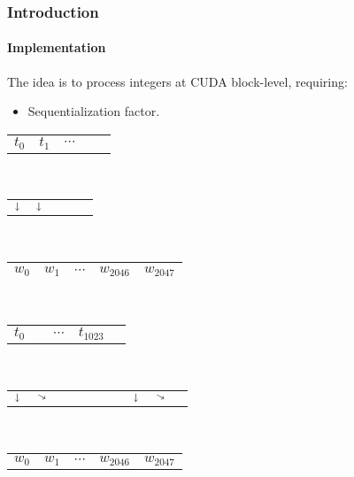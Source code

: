 \begin{frame}
  \frametitle{Introduction}
  \framesubtitle{Implementation}
  The idea is to process integers at CUDA block-level\pause , requiring:
  \begin{itemize}
  \item Sequentialization factor.
  \end{itemize}\vspace*{-0.4em}
  \begin{center}
  {\tiny
  \begin{minipage}{0.45\textwidth}
    \centering
      \begin{tabular}{C{0.6cm}C{0.6cm}C{0.6cm}C{0.6cm}C{0.6cm}}
        $t_0$ & $t_1$ & $\cdots$ & & \\
      \end{tabular}\\[-0.5ex]
      \begin{tabular}{C{0.6cm}C{0.6cm}C{0.6cm}C{0.6cm}C{0.6cm}}
        $\shortdownarrow$ & $\shortdownarrow$ & & & \\
      \end{tabular}\\[-0.5ex]
      \begin{tabular}{|C{0.59cm}|C{0.59cm}|C{0.59cm}|C{0.59cm}|C{0.59cm}|}
        \hline
        $w_0$ & $w_1$ & $\cdots$ & $w_{2046}$ & $w_{2047}$\\
        \hline
      \end{tabular}\\
    \end{minipage}\qquad
    \begin{minipage}{0.45\textwidth}
      \centering
      \begin{tabular}{C{0.6cm}C{0.6cm}C{0.6cm}C{0.6cm}C{0.6cm}}
        $t_0$ & & $\cdots$ & $t_{1023}$ & \\
      \end{tabular}\\[-0.5ex]
      \begin{tabular}{C{0.02cm}C{0.02cm}C{0.02cm}C{0.02cm}C{0.02cm}C{0.02cm}C{0.02cm}C{0.02cm}C{0.02cm}C{0.02cm}}
        $\shortdownarrow$ & $\diagonalarrowdown$ &  &  &  &  &  & $\shortdownarrow$ & $\diagonalarrowdown$ & \\
      \end{tabular}\\[-0.5ex]
      \begin{tabular}{|C{0.59cm}|C{0.59cm}|C{0.59cm}|C{0.59cm}|C{0.59cm}|}
        \hline
        $w_0$ & $w_1$ & $\cdots$ & $w_{2046}$ & $w_{2047}$\\

\end{tabular}
\end{minipage}}
\end{center}
\end{frame}
